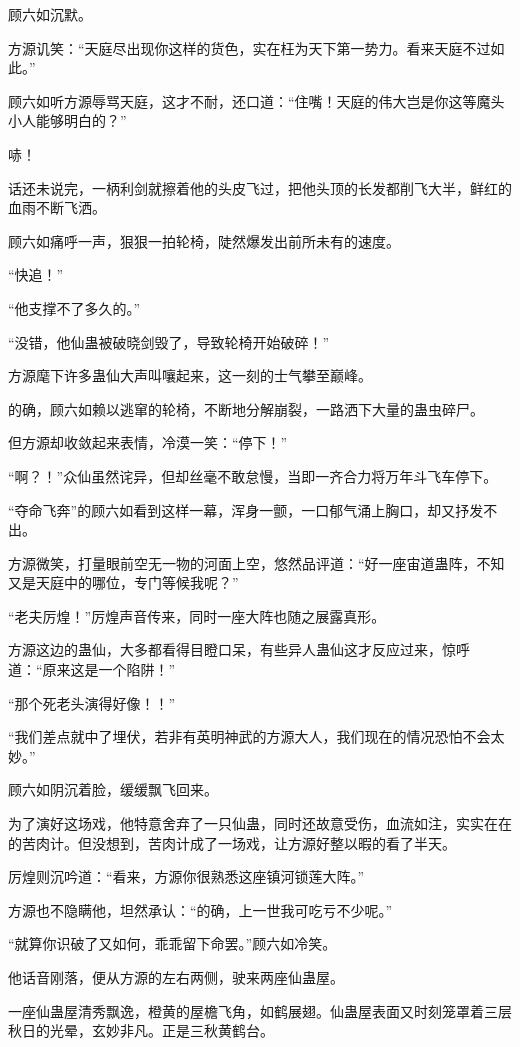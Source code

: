 \begin{this_body}
顾六如沉默。

方源讥笑：“天庭尽出现你这样的货色，实在枉为天下第一势力。看来天庭不过如此。”

顾六如听方源辱骂天庭，这才不耐，还口道：“住嘴！天庭的伟大岂是你这等魔头小人能够明白的？”

哧！

话还未说完，一柄利剑就擦着他的头皮飞过，把他头顶的长发都削飞大半，鲜红的血雨不断飞洒。

顾六如痛呼一声，狠狠一拍轮椅，陡然爆发出前所未有的速度。

“快追！”

“他支撑不了多久的。”

“没错，他仙蛊被破晓剑毁了，导致轮椅开始破碎！”

方源麾下许多蛊仙大声叫嚷起来，这一刻的士气攀至巅峰。

的确，顾六如赖以逃窜的轮椅，不断地分解崩裂，一路洒下大量的蛊虫碎尸。

但方源却收敛起来表情，冷漠一笑：“停下！”

“啊？！”众仙虽然诧异，但却丝毫不敢怠慢，当即一齐合力将万年斗飞车停下。

“夺命飞奔”的顾六如看到这样一幕，浑身一颤，一口郁气涌上胸口，却又抒发不出。

方源微笑，打量眼前空无一物的河面上空，悠然品评道：“好一座宙道蛊阵，不知又是天庭中的哪位，专门等候我呢？”

“老夫厉煌！”厉煌声音传来，同时一座大阵也随之展露真形。

方源这边的蛊仙，大多都看得目瞪口呆，有些异人蛊仙这才反应过来，惊呼道：“原来这是一个陷阱！”

“那个死老头演得好像！！”

“我们差点就中了埋伏，若非有英明神武的方源大人，我们现在的情况恐怕不会太妙。”

顾六如阴沉着脸，缓缓飘飞回来。

为了演好这场戏，他特意舍弃了一只仙蛊，同时还故意受伤，血流如注，实实在在的苦肉计。但没想到，苦肉计成了一场戏，让方源好整以暇的看了半天。

厉煌则沉吟道：“看来，方源你很熟悉这座镇河锁莲大阵。”

方源也不隐瞒他，坦然承认：“的确，上一世我可吃亏不少呢。”

“就算你识破了又如何，乖乖留下命罢。”顾六如冷笑。

他话音刚落，便从方源的左右两侧，驶来两座仙蛊屋。

一座仙蛊屋清秀飘逸，橙黄的屋檐飞角，如鹤展翅。仙蛊屋表面又时刻笼罩着三层秋日的光晕，玄妙非凡。正是三秋黄鹤台。


\end{this_body}

